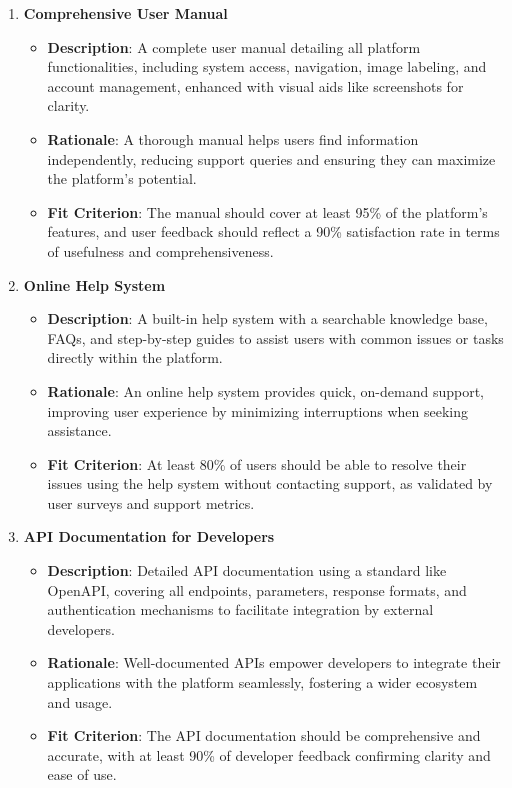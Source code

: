 \documentclass[12pt]{article}
\begin{document}
\begin{enumerate}
    \item \textbf{Comprehensive User Manual}  
        \begin{itemize} 
            \item \textbf{Description}: A complete user manual detailing all platform functionalities, including system access, navigation, image labeling, and account management, enhanced with visual aids like screenshots for clarity.  
            \item \textbf{Rationale}: A thorough manual helps users find information independently, reducing support queries and ensuring they can maximize the platform’s potential.  
            \item \textbf{Fit Criterion}: The manual should cover at least 95\% of the platform's features, and user feedback should reflect a 90\% satisfaction rate in terms of usefulness and comprehensiveness.
        \end{itemize}
    \item \textbf{Online Help System}  
        \begin{itemize} 
            \item \textbf{Description}: A built-in help system with a searchable knowledge base, FAQs, and step-by-step guides to assist users with common issues or tasks directly within the platform.  
            \item \textbf{Rationale}: An online help system provides quick, on-demand support, improving user experience by minimizing interruptions when seeking assistance.  
            \item \textbf{Fit Criterion}: At least 80\% of users should be able to resolve their issues using the help system without contacting support, as validated by user surveys and support metrics.
        \end{itemize}
    \item \textbf{API Documentation for Developers}  
        \begin{itemize} 
            \item \textbf{Description}: Detailed API documentation using a standard like OpenAPI, covering all endpoints, parameters, response formats, and authentication mechanisms to facilitate integration by external developers.  
            \item \textbf{Rationale}: Well-documented APIs empower developers to integrate their applications with the platform seamlessly, fostering a wider ecosystem and usage.  
            \item \textbf{Fit Criterion}: The API documentation should be comprehensive and accurate, with at least 90\% of developer feedback confirming clarity and ease of use.

\end{itemize}
\end{enumerate}
\end{document}
